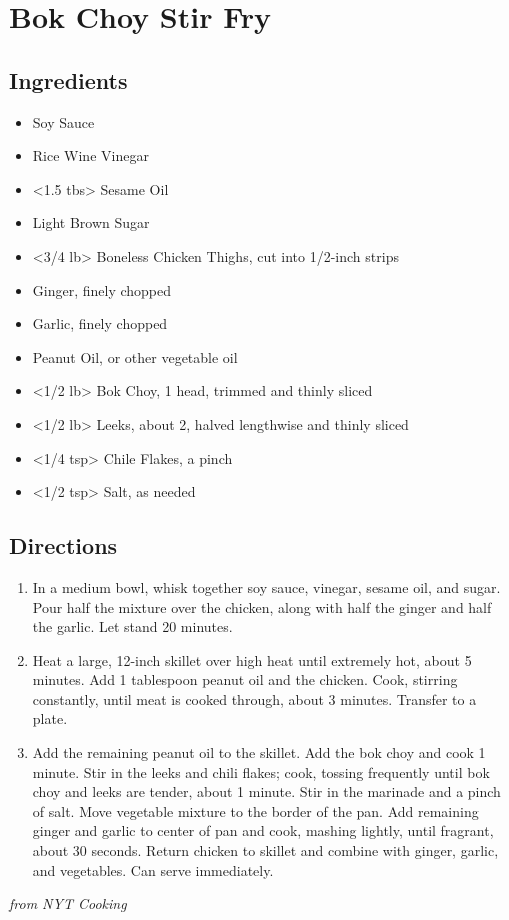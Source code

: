 \section{Bok Choy Stir Fry}

\subsection{ Ingredients }

\begin{itemize}
  \item <2 tbs> Soy Sauce
  \item <2 tbs> Rice Wine Vinegar
  \item <1.5 tbs> Sesame Oil
  \item <2 tsp> Light Brown Sugar
  \item <3/4 lb> Boneless Chicken Thighs, cut into 1/2-inch strips
  \item <2 tbs> Ginger, finely chopped 
  \item <2 cloves> Garlic, finely chopped
  \item <3 tbs> Peanut Oil, or other vegetable oil
  \item <1/2 lb> Bok Choy, 1 head, trimmed and thinly sliced
  \item <1/2 lb> Leeks, about 2, halved lengthwise and thinly sliced
  \item <1/4 tsp> Chile Flakes, a pinch
  \item <1/2 tsp> Salt, as needed
\end{itemize}

\subsection{ Directions }

\begin{enumerate}

  \item In a medium bowl, whisk together soy sauce, vinegar, sesame oil, and sugar. Pour half the mixture over the chicken, along with half the ginger and half the garlic. Let stand 20 minutes.

  \item Heat a large, 12-inch skillet over high heat until extremely hot, about 5 minutes. Add 1 tablespoon peanut oil and the chicken. Cook, stirring constantly, until meat is cooked through, about 3 minutes. Transfer to a plate.

  \item Add the remaining peanut oil to the skillet. Add the bok choy and cook 1 minute. Stir in the leeks and chili flakes; cook, tossing frequently until bok choy and leeks are tender, about 1 minute. Stir in the marinade and a pinch of salt. Move vegetable mixture to the border of the pan. Add remaining ginger and garlic to center of pan and cook, mashing lightly, until fragrant, about 30 seconds. Return chicken to skillet and combine with ginger, garlic, and vegetables. Can serve immediately. 

\end{enumerate}

\textit{ from NYT Cooking }
